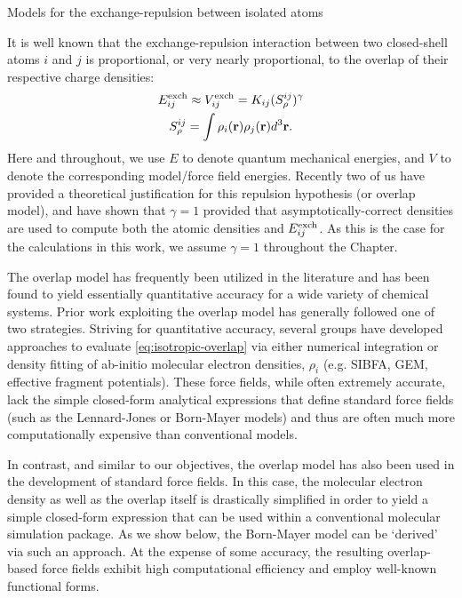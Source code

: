 \begin{subsection}{Models for the exchange-repulsion between isolated atoms}
\label{sec:isotropic-homoatomic_vrep}

It is well known that the exchange-repulsion interaction between two
closed-shell atoms $i$ and $j$ is proportional, or very nearly proportional, 
to the overlap of their respective charge densities:
\cite{Kim1981}
%
\begin{gather}
\label{eq:isotropic-atomic_vrep}
E^{\text{exch}}_{ij} \approx V^{\text{exch}}_{ij} = K_{ij}(S_{\rho}^{ij})^{\gamma} \\
\label{eq:isotropic-overlap}
S^{ij}_{\rho} = \int \rho_i(\mathbf{r}) \rho_j(\mathbf{r}) d^3\mathbf{r}.
\end{gather}
%
Here and throughout, we use $E$ to denote quantum mechanical energies,
and $V$ to denote the corresponding model/force field energies.
Recently two of us have
provided a theoretical justification for this repulsion hypothesis (or overlap
model), and have shown that
$\gamma=1$ provided that asymptotically-correct densities are used to
compute both the atomic densities and $E^{\text{exch}}_{ij}$.\cite{Stone2007,Misquitta2015a} 
As this is the case for the calculations in this work, we assume $\gamma=1$
throughout the Chapter.

The overlap model has frequently been utilized in the literature
and has been found to yield essentially quantitative accuracy for a wide variety of
chemical systems.\cite{Kim1981,Nyeland1986,Ihm1990} 
Prior work exploiting the overlap model has generally followed
one of two strategies. Striving for quantitative accuracy, several
groups have developed approaches to evaluate \cref{eq:isotropic-overlap}
via either numerical integration or density fitting of ab-initio molecular
electron densities, $\rho_{i}$ (e.g. SIBFA, GEM, effective fragment potentials).
\cite{Duke2014,Elking2010,Cisneros2006a,Chaudret2014,Chaudret2013,Ohrn2016,
Gresh2007,Gordon2001,Xie2007,Xie2009}
These force fields, while often extremely accurate, lack the simple closed-form analytical expressions that
define standard force fields (such as the Lennard-Jones or Born-Mayer models) and thus are often
much more computationally expensive than conventional models.

In contrast, and similar to our objectives, the overlap model has also been used in the development of standard
force fields. In this case, the molecular electron density as well as the overlap
itself is drastically simplified in order to yield a simple closed-form
expression that can be used within a conventional molecular simulation package.
\cite{Kim1981,Nyeland1986,Ihm1990} 
As we show below, the Born-Mayer model can be `derived' via such an approach.  At the expense of some accuracy, the resulting
overlap-based force fields exhibit high computational efficiency and employ well-known functional forms.


\end{subsection}
